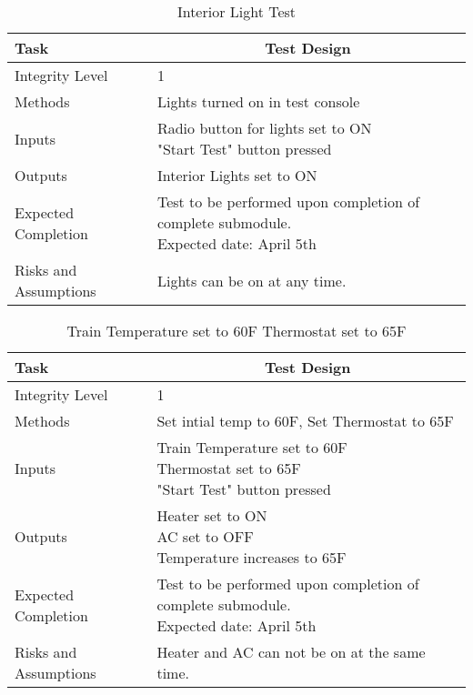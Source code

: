 \documentclass[]{article}
\begin{document}
	\begin{table}[H]
		\centering
		\caption{Interior Light Test}
		\begin{tabular}{|l|l|}
			\hline
			Task & \multicolumn{1}{c|}{Test Design} \\ \hline
			Integrity Level & 1 \\ \hline
			Methods & Lights turned on in test console  \\ \hline
			Inputs &  \parbox[t]{10cm}{Radio button for lights set to ON\\ "Start Test" button pressed }\\ \hline
			Outputs &Interior Lights set to ON \\ \hline
			Expected Completion & \parbox[t]{10cm}{Test to be performed upon completion of complete submodule.\\ Expected date: April 5th}\\ \hline
			Risks and Assumptions & Lights can be on at any time.\\ \hline
		\end{tabular}
	\end{table}

	\begin{table}[H]
		\centering
		\caption{Train Temperature set to 60F Thermostat set to 65F}
		\begin{tabular}{|l|l|}
			\hline
			Task & \multicolumn{1}{c|}{Test Design} \\ \hline
			Integrity Level & 1 \\ \hline
			Methods & Set intial temp to 60F, Set Thermostat to 65F  \\ \hline
			Inputs &  \parbox[t]{10cm}{Train Temperature set to 60F\\ Thermostat set to 65F\\ "Start Test" button pressed }\\ \hline
			Outputs &\parbox[t]{10cm}{ Heater set to ON\\AC set to OFF\\ Temperature increases to 65F} \\ \hline
			Expected Completion & \parbox[t]{10cm}{Test to be performed upon completion of complete submodule.\\ Expected date: April 5th}\\ \hline
			Risks and Assumptions & Heater and AC can not be on at the same time.\\ \hline
		\end{tabular}
	\end{table}
\end{document}
